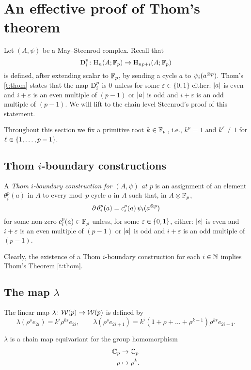 
\section{An effective proof of Thom's theorem}\label{s:thom}

\noindent Let $(A,\psi)$ be a May--Steenrod complex.
Recall that
\[
\mathrm{D}_i^p \colon \mathrm{H}_n(A; {\mathbb{F}_p}) \to \mathrm{H}_{np+i}(A; {\mathbb{F}_p})
\]
is defined, after extending scalar to ${\mathbb{F}_p}$, by sending a cycle $a$ to $\psi_i(a^{\otimes p})$.
Thom's \cref{t:thom} states that the map $\mathrm{D}_i^p$ is $0$ unless for some $\varepsilon \in \{0,1\}$ either: $\lvert a\rvert$ is even and $i+\varepsilon$ is an even multiple of $(p-1)$ or $\lvert a\rvert$ is odd and $i+\varepsilon$ is an odd multiple of $(p-1)$.
We will lift to the chain level Steenrod's proof of this statement.

Throughout this section we fix a primitive root $k \in {\mathbb{F}_p}$\,, i.e., $k^p = 1$ and $k^\ell \neq 1$ for $\ell \in \{1,\dots,p-1\}$.

\subsection{Thom $i$-boundary constructions}

A \textit{Thom $i$-boundary construction for $(A,\psi)$ at $p$} is an assignment of an element $\theta_i^p(a)$ in $A$ to every mod~$p$ cycle $a$ in $A$ such that, in $A \otimes {\mathbb{F}_p}$,
\[
\operatorname{\partial} \theta_i^p(a) = c_i^p(a) \, \psi_i(a^{\otimes p})
\]
for some non-zero $c_i^p(a) \in {\mathbb{F}_p}$ unless, for some $\varepsilon \in \{0,1\}$, either: $\lvert a\rvert$ is even and $i+\varepsilon$ is an even multiple of $(p-1)$ or $\lvert a\rvert$ is odd and $i+\varepsilon$ is an odd multiple of $(p-1)$.

Clearly, the existence of a Thom $i$-boundary construction for each $i \in \mathbb{N}$ implies Thom's Theorem \cref{t:thom}.

\subsection{The map $\lambda$}

The linear map $\lambda \colon \mathcal{W}(p) \to \mathcal{W}(p)$ is defined by
\[
\lambda(\rho^s e_{2i}) = k^i \rho^{ks} e_{2i}, \qquad
\lambda(\rho^s e_{2i+1}) = k^i (1+\rho+\dots+\rho^{k-1}) \rho^{ks} e_{2i+1}.
\]

\begin{lemma}
	$\lambda$ is a chain map equivariant for the group homomorphism
	\begin{align*}
		\mathbb{C}_p &\to \mathbb{C}_p \\
		\rho &\mapsto \rho^k.
	\end{align*}
\end{lemma}


